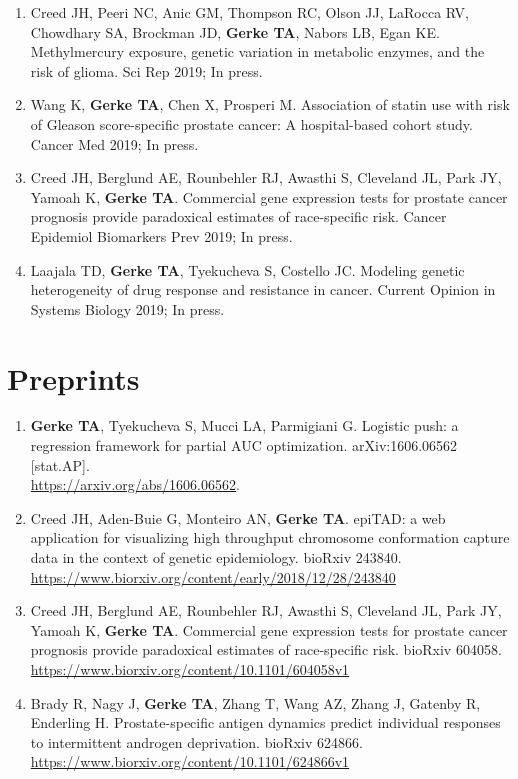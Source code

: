 \documentclass[11pt, a4paper]{article} %
\begin{document}
\begin{enumerate}[leftmargin=*]
\item{} Creed JH, Peeri NC, Anic GM, Thompson RC, Olson JJ, LaRocca RV, Chowdhary SA, Brockman JD, {\bf Gerke TA}, Nabors LB, Egan KE. Methylmercury exposure, genetic variation in metabolic enzymes, and the risk of glioma. Sci Rep 2019; In press.

\item{} Wang K, {\bf Gerke TA}, Chen X, Prosperi M. Association of statin use with risk of Gleason score-specific prostate cancer: A hospital-based cohort study. Cancer Med 2019; In press.

\item{} Creed JH, Berglund AE, Rounbehler RJ, Awasthi S, Cleveland JL, Park JY, Yamoah K, {\bf Gerke TA}. Commercial gene expression tests for prostate cancer prognosis provide paradoxical estimates of race-specific risk. Cancer Epidemiol Biomarkers Prev 2019; In press.

\item{} Laajala TD, {\bf Gerke TA}, Tyekucheva S, Costello JC. Modeling genetic heterogeneity of drug response and resistance in cancer. Current Opinion in Systems Biology 2019; In press.

\end{enumerate}

\section*{Preprints}
\begin{enumerate}[leftmargin=*]
\item{} {\bf Gerke TA}, Tyekucheva S, Mucci LA, Parmigiani G. Logistic push: a regression framework for partial AUC optimization. arXiv:1606.06562 [stat.AP].\\\href{https://arxiv.org/abs/1606.06562}{https://arxiv.org/abs/1606.06562}.

\item{} Creed JH, Aden-Buie G, Monteiro AN, {\bf Gerke TA}. epiTAD: a web application for visualizing high throughput chromosome conformation capture data in the context of genetic epidemiology. bioRxiv 243840. \\\href{https://www.biorxiv.org/content/early/2018/12/28/243840}{https://www.biorxiv.org/content/early/2018/12/28/243840}

\item{} Creed JH, Berglund AE, Rounbehler RJ, Awasthi S, Cleveland JL, Park JY, Yamoah K, {\bf Gerke TA}. Commercial gene expression tests for prostate cancer prognosis provide paradoxical estimates of race-specific risk. bioRxiv 604058. \\\href{https://www.biorxiv.org/content/10.1101/604058v1}{https://www.biorxiv.org/content/10.1101/604058v1}

\item{} Brady R, Nagy J, {\bf Gerke TA}, Zhang T, Wang AZ, Zhang J, Gatenby R, Enderling H. Prostate-specific antigen dynamics predict individual responses to intermittent androgen deprivation. bioRxiv 624866. \href{https://www.biorxiv.org/content/10.1101/624866v1}{https://www.biorxiv.org/content/10.1101/624866v1}
\end{enumerate}
\end{document}
